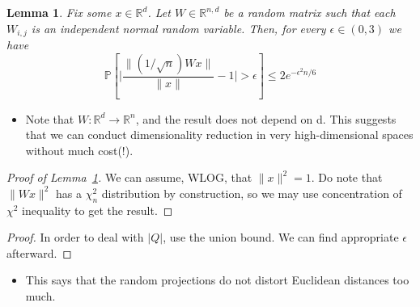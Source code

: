 \documentclass[11pt,reqno]{amsart}
\newtheorem{lemma}[theorem]{Lemma}
\theoremstyle{remark}
\begin{document}
\begin{lemma}\label{lem:concentration}
Fix some $x\in\mathbb{R}^d$. Let $W\in\mathbb{R}^{n,d}$ be a random matrix such that each $W_{i,j}$
 is an independent normal random variable. Then, for every $\epsilon\in (0,3)$ we have
 \begin{equation}
 \mathbb{P}[\lvert \frac{\lVert (1/\sqrt n)Wx\rVert}{\lVert 
    x\rVert}-1 \rvert>\epsilon]\leq 2e^{-\epsilon^2 n/6}
 \end{equation}
\end{lemma}
\begin{itemize}
\item Note that $W:\mathbb{R}^d\to\mathbb{R}^n$, and the result does not depend on d. This suggests
 that we can conduct dimensionality reduction in very high-dimensional spaces without much cost(!).
\end{itemize}
\begin{proof}[Proof of Lemma~\ref{lem:concentration}]
We can assume, WLOG, that $\lVert x\rVert^2=1$. Do note that $\lVert Wx\rVert^2$ has a $\chi_n^2$ distribution
 by construction, so we may use concentration of $\chi^2$ inequality to get the result.
\end{proof}
\begin{proof}
In order to deal with $\lvert Q\rvert$, use the union bound. We can find appropriate $\epsilon$ afterward.
\end{proof}
\begin{itemize}
\item This says that the random projections do not distort Euclidean distances too much.
\end{itemize}
\end{document}
